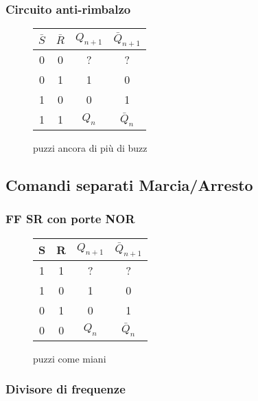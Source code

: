 \subsubsection*{Circuito anti-rimbalzo}


\begin{figure}[H]
		\centering
		{\renewcommand{\arraystretch}{1.1}%
		\begin{tabular}{c|c|c|c}
		$\bar S$ & $\bar R$ & $Q_{n+1}$ & $\bar Q_{n+1}$  \\
		\hline
		0 & 0  & ?&?\\
		\hline
		0&1 & 1 & 0\\
		\hline
		1&0 & 0  &1\\
		\hline
		1&1 & $Q_n$ & $\bar Q_n$\\
		\end{tabular}}
		\label{tab11:antirimb}
		\caption{puzzi ancora di più di buzz}
        \end{figure}

\subsection*{Comandi separati Marcia/Arresto}




\subsubsection*{FF SR con porte NOR}


\begin{figure}[H]
		\centering
		{\renewcommand{\arraystretch}{1.1}%
		\begin{tabular}{c|c|c|c}
		S & R & $Q_{n+1}$ & $\bar Q_{n+1}$  \\
		\hline
		1 & 1  & ?&?\\
		\hline
		1&0 & 1 & 0\\
		\hline
		0&1 & 0  &1\\
		\hline
		0&0 & $Q_n$ & $\bar Q_n$\\
		\end{tabular}}
		\label{tab11:nor}
		\caption{puzzi come miani}
        \end{figure}


\subsubsection*{Divisore di frequenze}




